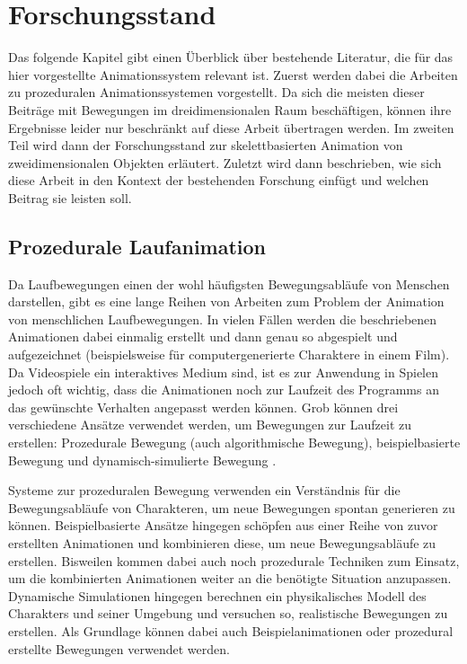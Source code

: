 \chapter{Forschungsstand}
Das folgende Kapitel gibt einen Überblick über bestehende Literatur, die für das hier vorgestellte Animationssystem relevant ist. Zuerst werden dabei die Arbeiten zu prozeduralen Animationssystemen vorgestellt. Da sich die meisten dieser Beiträge mit Bewegungen im dreidimensionalen Raum beschäftigen, können ihre Ergebnisse leider nur beschränkt auf diese Arbeit übertragen werden. Im zweiten Teil wird dann der Forschungsstand zur skelettbasierten Animation von zweidimensionalen Objekten erläutert. Zuletzt wird dann beschrieben, wie sich diese Arbeit in den Kontext der bestehenden Forschung einfügt und welchen Beitrag sie leisten soll.


\section{Prozedurale Laufanimation}
Da Laufbewegungen einen der wohl häufigsten Bewegungsabläufe von Menschen darstellen, gibt es eine lange Reihen von Arbeiten zum Problem der Animation von menschlichen Laufbewegungen. In vielen Fällen werden die beschriebenen Animationen dabei einmalig erstellt und dann genau so abgespielt und aufgezeichnet (beispielsweise für computergenerierte Charaktere in einem Film). Da Videospiele ein interaktives Medium sind, ist es zur Anwendung in Spielen jedoch oft wichtig, dass die Animationen noch zur Laufzeit des Programms an das gewünschte Verhalten angepasst werden können. Grob können drei verschiedene Ansätze verwendet werden, um Bewegungen zur Laufzeit zu erstellen: Prozedurale Bewegung (auch algorithmische Bewegung), beispielbasierte Bewegung und dynamisch-simulierte Bewegung \cite{johansen2009automated}.

Systeme zur prozeduralen Bewegung verwenden ein Verständnis für die Bewegungsabläufe von Charakteren, um neue Bewegungen spontan generieren zu können. Beispielbasierte Ansätze hingegen schöpfen aus einer Reihe von zuvor erstellten Animationen und kombinieren diese, um neue Bewegungsabläufe zu erstellen. Bisweilen kommen dabei auch noch prozedurale Techniken zum Einsatz, um die kombinierten Animationen weiter an die benötigte Situation anzupassen. Dynamische Simulationen hingegen berechnen ein physikalisches Modell des Charakters und seiner Umgebung und versuchen so, realistische Bewegungen zu erstellen. Als Grundlage können dabei auch Beispielanimationen oder prozedural erstellte Bewegungen verwendet werden.

